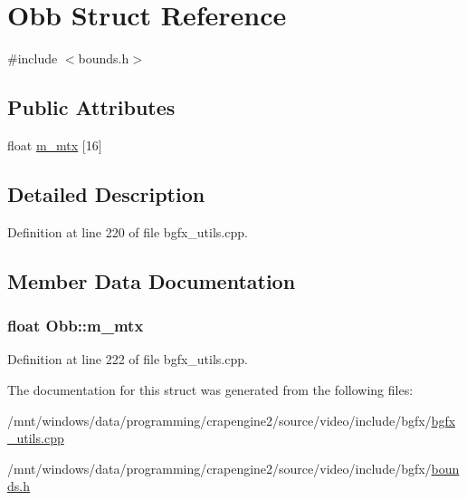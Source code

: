 \hypertarget{struct_obb}{\section{Obb Struct Reference}
\label{struct_obb}
}


{\ttfamily \#include $<$bounds.\+h$>$}

\subsection*{Public Attributes}
\begin{DoxyCompactItemize}
\item 
float \hyperlink{struct_obb_a1c627c3655d7bfdd72e482a5e07853f5}{m\+\_\+mtx} \mbox{[}16\mbox{]}
\end{DoxyCompactItemize}


\subsection{Detailed Description}


Definition at line 220 of file bgfx\+\_\+utils.\+cpp.



\subsection{Member Data Documentation}
\hypertarget{struct_obb_a1c627c3655d7bfdd72e482a5e07853f5}{
\subsubsection[{m\+\_\+mtx}]{\setlength{\rightskip}{0pt plus 5cm}float Obb\+::m\+\_\+mtx}}\label{struct_obb_a1c627c3655d7bfdd72e482a5e07853f5}


Definition at line 222 of file bgfx\+\_\+utils.\+cpp.



The documentation for this struct was generated from the following files\+:\begin{DoxyCompactItemize}
\item 
/mnt/windows/data/programming/crapengine2/source/video/include/bgfx/\hyperlink{bgfx__utils_8cpp}{bgfx\+\_\+utils.\+cpp}\item 
/mnt/windows/data/programming/crapengine2/source/video/include/bgfx/\hyperlink{bounds_8h}{bounds.\+h}\end{DoxyCompactItemize}
